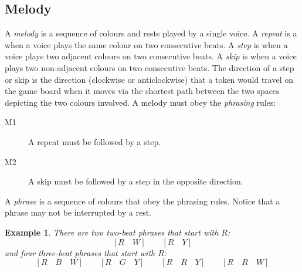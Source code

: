 \documentclass{scrartcl}
\newtheorem{example}{Example}
\begin{document}
\subsection{Melody}
A \emph{melody} is a sequence of colours and rests played by a single voice.  A \emph{repeat} is a when a voice plays the same colour on two consecutive beats. A \emph{step} is when a voice plays two adjacent colours on two consecutive beats. A \emph{skip} is when a voice plays two non-adjacent colours on two consecutive beats.  The direction of a step or skip
is the direction (clockwise or anticlockwise) that a token would travel on the game board
when it moves via the shortest path between the two spaces depicting the two colours involved. A melody must obey the \emph{phrasing} rules: 
\begin{description}
	\item[M1] A repeat must be followed by a step.
	\item[M2] A skip must be followed by a step in the opposite direction.
\end{description}
A \emph{phrase} is a sequence of colours that obey the phrasing rules. Notice that a phrase may not be interrupted by a rest.
\begin{example}
There are two two-beat phrases that start with $R$:
\begin{equation}\nonumber
	[R \quad W] \qquad [R \quad Y]
\end{equation}
and four three-beat phrases that start with $R$:
\begin{equation}\nonumber
	[R \quad B \quad W] \qquad [R \quad G \quad Y] \qquad [R \quad R \quad Y] \qquad [R \quad R \quad W]
\end{equation}
\end{example}
\end{document}
